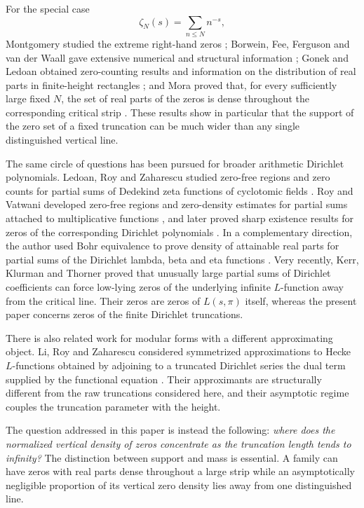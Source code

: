 \documentclass[11pt]{article}
\theoremstyle{definition}
\newcommand{\1}{\mathbf 1}
\begin{document}
For the special case
\begin{equation}\label{eq:zetaN-intro}
\zeta_N(s)=\sum_{n\le N}n^{-s},
\end{equation}
Montgomery studied the extreme right-hand zeros \cite{Montgomery1983}; Borwein, Fee, Ferguson and van der Waall gave extensive numerical and structural information \cite{BorweinEtAl2007}; Gonek and Ledoan obtained zero-counting results and information on the distribution of real parts in finite-height rectangles \cite{GonekLedoan2010}; and Mora proved that, for every sufficiently large fixed $N$, the set of real parts of the zeros is dense throughout the corresponding critical strip \cite{Mora2013}.  These results show in particular that the support of the zero set of a fixed truncation can be much wider than any single distinguished vertical line.

The same circle of questions has been pursued for broader arithmetic Dirichlet polynomials.  Ledoan, Roy and Zaharescu studied zero-free regions and zero counts for partial sums of Dedekind zeta functions of cyclotomic fields \cite{LedoanRoyZaharescu2014}.  Roy and Vatwani developed zero-free regions and zero-density estimates for partial sums attached to multiplicative functions \cite{RoyVatwani2019}, and later proved sharp existence results for zeros of the corresponding Dirichlet polynomials \cite{RoyVatwani2021}.  In a complementary direction, the author used Bohr equivalence to prove density of attainable real parts for partial sums of the Dirichlet lambda, beta and eta functions \cite{Dubon2025}.  Very recently, Kerr, Klurman and Thorner \cite{KerrKlurmanThorner2026} proved that unusually large partial sums of Dirichlet coefficients can force low-lying zeros of the underlying infinite $L$-function away from the critical line.  Their zeros are zeros of $L(s,\pi)$ itself, whereas the present paper concerns zeros of the finite Dirichlet truncations.

There is also related work for modular forms with a different approximating object.  Li, Roy and Zaharescu considered symmetrized approximations to Hecke $L$-functions obtained by adjoining to a truncated Dirichlet series the dual term supplied by the functional equation \cite{LiRoyZaharescu2016}.  Their approximants are structurally different from the raw truncations considered here, and their asymptotic regime couples the truncation parameter with the height.

The question addressed in this paper is instead the following: \emph{where does the normalized vertical density of zeros concentrate as the truncation length tends to infinity?}  The distinction between support and mass is essential.  A family can have zeros with real parts dense throughout a large strip while an asymptotically negligible proportion of its vertical zero density lies away from one distinguished line.
\end{document}

